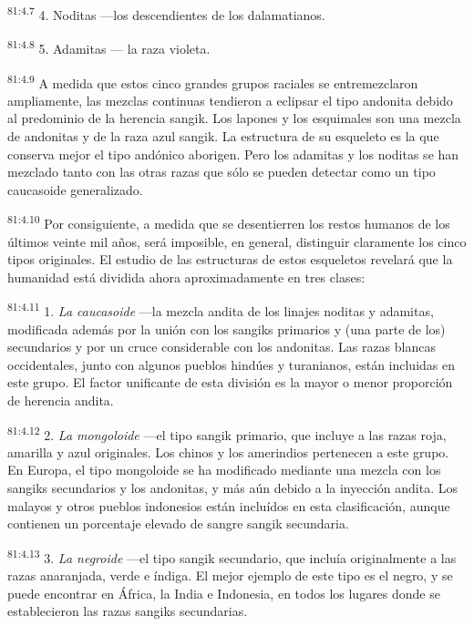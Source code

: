 \documentclass[twoside, 11pt]{book}
\begin{document}
\par
\textsuperscript{81:4.7} 4. Noditas ---los descendientes de los dalamatianos.

\par
\textsuperscript{81:4.8} 5. Adamitas --- la raza violeta.

\par
\textsuperscript{81:4.9} A medida que estos cinco grandes grupos raciales se entremezclaron ampliamente, las mezclas continuas tendieron a eclipsar el tipo andonita debido al predominio de la herencia sangik. Los lapones y los esquimales son una mezcla de andonitas y de la raza azul sangik. La estructura de su esqueleto es la que conserva mejor el tipo andónico aborigen. Pero los adamitas y los noditas se han mezclado tanto con las otras razas que sólo se pueden detectar como un tipo caucasoide generalizado.

\par
\textsuperscript{81:4.10} Por consiguiente, a medida que se desentierren los restos humanos de los últimos veinte mil años, será imposible, en general, distinguir claramente los cinco tipos originales. El estudio de las estructuras de estos esqueletos revelará que la humanidad está dividida ahora aproximadamente en tres clases:

\par
\textsuperscript{81:4.11} 1. \textit{La caucasoide} ---la mezcla andita de los linajes noditas y adamitas, modificada además por la unión con los sangiks primarios y (una parte de los) secundarios y por un cruce considerable con los andonitas. Las razas blancas occidentales, junto con algunos pueblos hindúes y turanianos, están incluidas en este grupo. El factor unificante de esta división es la mayor o menor proporción de herencia andita.

\par
\textsuperscript{81:4.12} 2. \textit{La mongoloide} ---el tipo sangik primario, que incluye a las razas roja, amarilla y azul originales. Los chinos y los amerindios pertenecen a este grupo. En Europa, el tipo mongoloide se ha modificado mediante una mezcla con los sangiks secundarios y los andonitas, y más aún debido a la inyección andita. Los malayos y otros pueblos indonesios están incluídos en esta clasificación, aunque contienen un porcentaje elevado de sangre sangik secundaria.

\par
\textsuperscript{81:4.13} 3. \textit{La negroide} ---el tipo sangik secundario, que incluía originalmente a las razas anaranjada, verde e índiga. El mejor ejemplo de este tipo es el negro, y se puede encontrar en África, la India e Indonesia, en todos los lugares donde se establecieron las razas sangiks secundarias.
\end{document}

